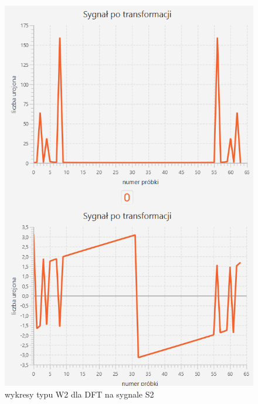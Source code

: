 \documentclass[12pt]{article}
\begin{document}
\begin{figure}[H]
	\centering
	\includegraphics[width=\linewidth]{S2_DFT_W2.png}
	\caption{wykresy typu W2 dla DFT na sygnale S2}
	\label{S2_DFT_W2}
\end{figure}
\end{document}
